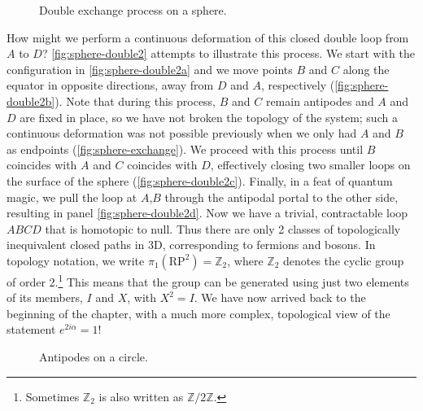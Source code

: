 \documentclass[12pt, english]{book}
\begin{document}
\begin{figure}[!ht]
	\centering 
	\caption{Double exchange process on a sphere.}
	\label{fig:sphere-double2}
\end{figure}

How might we perform a continuous deformation of this closed double loop from $A$ to $D$?
\autoref{fig:sphere-double2} attempts to illustrate this process.
We start with the configuration in \ref{fig:sphere-double2a} and we move points $B$ and $C$ along the equator in opposite directions, away from $D$ and $A$, respectively (\ref{fig:sphere-double2b}). 
Note that during this process, $B$ and $C$ remain antipodes and $A$ and $D$ are fixed in place, so we have not broken the topology of the system; such a continuous deformation was not possible previously when we only had $A$ and $B$ as endpoints (\ref{fig:sphere-exchange}).
We proceed with this process until $B$ coincides with $A$ and $C$ coincides with $D$, effectively closing two smaller loops on the surface of the sphere (\ref{fig:sphere-double2c}). 
Finally, in a feat of quantum magic, we pull the loop at $A$,$B$ through the antipodal portal to the other side, resulting in panel \ref{fig:sphere-double2d}.
Now we have a trivial, contractable loop $ABCD$ that is homotopic to null.
Thus there are only 2 classes of topologically inequivalent closed paths in 3D, corresponding to fermions and bosons.
In topology notation, we write $\pi_1(\mathrm{RP}^2) = \mathbb{Z}_2$, where $\mathbb{Z}_2$ denotes the cyclic group of order 2.\footnote{Sometimes $\mathbb{Z}_2$ is also written as $\mathbb{Z}/2\mathbb{Z}$.}
This means that the group can be generated using just two elements of its members, $I$ and $X$, with $X^2 = I$.
We have now arrived back to the beginning of the chapter, with a much more complex, topological view of the statement $e^{2i \alpha} = 1$!

\begin{figure}[!ht]
	\centering 
	\caption{Antipodes on a circle.}
	\label{fig:circle-exchange}
\end{figure}
\end{document}
